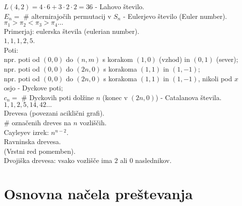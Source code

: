 \documentclass[a4paper, 12pt]{book}
\theoremstyle{definition}
\theoremstyle{remark}
\begin{document}
$L(4,2) = 4 \cdot 6 + 3 \cdot 2 \cdot 2 = 36$ - Lahovo število. \\
$E_n =$ \# alternirajočih permutacij v $S_n$ - Eulerjevo število (Euler number). \\
$\pi_1 > \pi_2 < \pi_3 > \pi_4 \dots$ \\
Primerjaj: eulerska števila (eulerian number). \\
$1, 1, 1, 2, 5$. \\
Poti: \\
npr. poti od $(0,0)$ do $(n,m)$ s korakom $(1,0)$ (vzhod) in $(0,1)$ (sever); \\
npr. poti od $(0,0)$ do $(2n,0)$ s korakoma $(1,1)$ in $(1,-1)$; \\
npr. poti od $(0,0)$ do $(2n,0)$ s korakoma $(1,1)$ in $(1,-1)$, nikoli pod $x$ osjo - Dyckove poti; \\
$c_n =$ \# Dyckovih poti dolžine $n$ (konec v $(2n,0)$) - Catalanova števila. \\
$1,1,2,5,14,42 \dots$ \\
Drevesa (povezani aciklični grafi). \\
\# označenih dreves na $n$ vozliščih. \\
Cayleyev izrek: $n^{n-2}$. \\
Ravninska drevesa. \\
(Vrstni red pomemben). \\
Dvojiška drevesa: vsako vozlišče ima $2$ ali $0$ naslednikov.


\section{Osnovna načela preštevanja}
\end{document}
